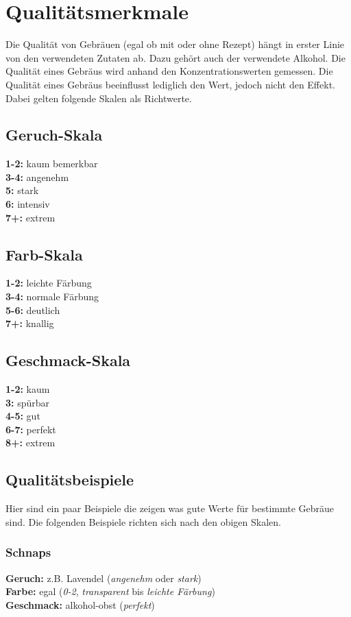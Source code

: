 \section{Qualitätsmerkmale}
Die Qualität von Gebräuen (egal ob mit oder ohne Rezept) hängt in erster Linie von den verwendeten Zutaten ab. Dazu gehört auch der verwendete Alkohol. Die Qualität eines Gebräus wird anhand den Konzentrationswerten gemessen. Die Qualität eines Gebräus beeinflusst lediglich den Wert, jedoch nicht den Effekt. Dabei gelten folgende Skalen als Richtwerte. 

\subsection{Geruch-Skala}
\textbf{1-2:} kaum bemerkbar \\
\textbf{3-4:} angenehm \\
\textbf{5:} stark \\
\textbf{6:} intensiv \\
\textbf{7+:} extrem 

\subsection{Farb-Skala}
\textbf{1-2:} leichte Färbung \\
\textbf{3-4:} normale Färbung \\
\textbf{5-6:} deutlich \\
\textbf{7+:} knallig

\subsection{Geschmack-Skala}
\textbf{1-2:} kaum \\
\textbf{3:} spürbar \\
\textbf{4-5:} gut \\
\textbf{6-7:} perfekt \\
\textbf{8+:} extrem

\subsection{Qualitätsbeispiele}
Hier sind ein paar Beispiele die zeigen was gute Werte für bestimmte Gebräue sind. Die folgenden Beispiele richten sich nach den obigen Skalen.

\subsubsection{Schnaps}
\textbf{Geruch:} z.B. Lavendel (\textit{angenehm} oder \textit{stark}) \\
\textbf{Farbe:} egal (\textit{0-2}, \textit{transparent} bis \textit{leichte Färbung}) \\
\textbf{Geschmack:} alkohol-obst (\textit{perfekt})

